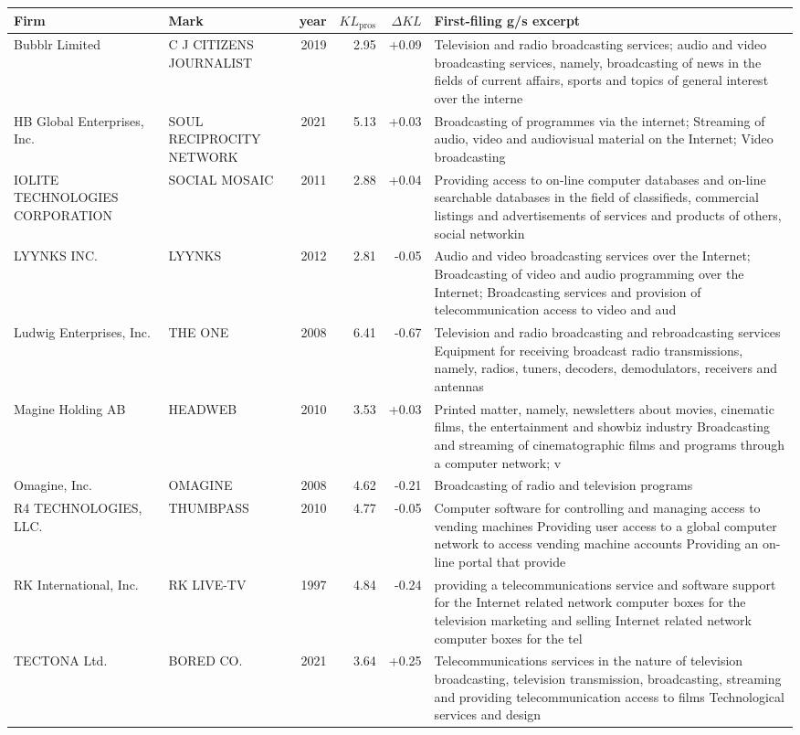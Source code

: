 \begin{tabular}{p{4.0cm}p{2.2cm}rrrp{6.5cm}}
\toprule
Firm & Mark & year & $KL_\text{pros}$ & $\Delta KL$ & First-filing g/s excerpt \\
\midrule
Bubblr Limited & C J CITIZENS JOURNALIST & 2019 & 2.95 & +0.09 & Television and radio broadcasting services; audio and video broadcasting services, namely, broadcasting of news in the fields of current affairs, sports and topics of general interest over the interne \\
HB Global Enterprises, Inc. & SOUL RECIPROCITY NETWORK & 2021 & 5.13 & +0.03 & Broadcasting of programmes via the internet; Streaming of audio, video and audiovisual material on the Internet; Video broadcasting \\
IOLITE TECHNOLOGIES CORPORATION & SOCIAL MOSAIC & 2011 & 2.88 & +0.04 & Providing access to on-line computer databases and on-line searchable databases in the field of classifieds, commercial listings and advertisements of services and products of others, social networkin \\
LYYNKS INC. & LYYNKS & 2012 & 2.81 & -0.05 & Audio and video broadcasting services over the Internet; Broadcasting of video and audio programming over the Internet; Broadcasting services and provision of telecommunication access to video and aud \\
Ludwig Enterprises, Inc. & THE ONE & 2008 & 6.41 & -0.67 & Television and radio broadcasting and rebroadcasting services Equipment for receiving broadcast radio transmissions, namely, radios, tuners, decoders, demodulators, receivers and antennas \\
Magine Holding AB & HEADWEB & 2010 & 3.53 & +0.03 & Printed matter, namely, newsletters about movies, cinematic films, the entertainment and showbiz industry Broadcasting and streaming of cinematographic films and programs through a computer network; v \\
Omagine, Inc. & OMAGINE & 2008 & 4.62 & -0.21 & Broadcasting of radio and television programs \\
R4 TECHNOLOGIES, LLC. & THUMBPASS & 2010 & 4.77 & -0.05 & Computer software for controlling and managing access to vending machines Providing user access to a global computer network to access vending machine accounts Providing an on-line portal that provide \\
RK International, Inc. & RK LIVE-TV & 1997 & 4.84 & -0.24 & providing a telecommunications service and software support for the Internet related network computer boxes for the television marketing and selling Internet related network computer boxes for the tel \\
TECTONA Ltd. & BORED CO. & 2021 & 3.64 & +0.25 & Telecommunications services in the nature of television broadcasting, television transmission, broadcasting, streaming and providing telecommunication access to films Technological services and design \\
\bottomrule
\end{tabular}
\clearpage

